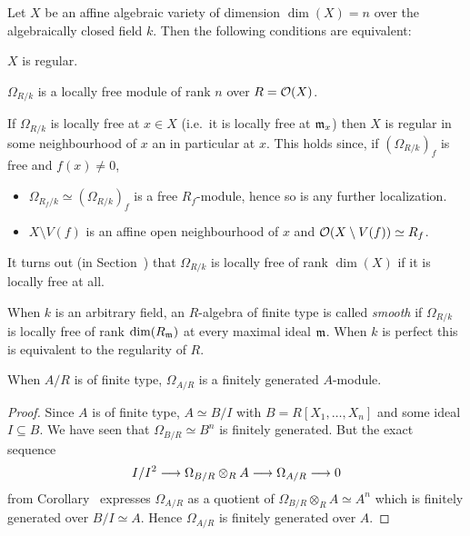 \documentclass[a4paper,parskip=half,numbers=enddot, DIV=12, headheight=30pt]{scrreprt}
\begin{document}
\begin{prop}
    Let $X$ be an affine algebraic variety of dimension $\dim (X)=n$ over the algebraically closed field $k$. Then the following conditions are equivalent:
    \begin{alphanumerate}
        \item 
            $X$ is regular.
        \item 
            $\Omega_{R/k}$ is a locally free module of rank $n$ over $R= \mathcal{O}(X)$.
    \end{alphanumerate}
\end{prop}
\begin{rem*}
    \begin{alphanumerate}
      \item 
        If $\Omega_{R/k}$ is locally free at $x\in X$ (i.e.\ it is locally free at $\mathfrak{m}_x$) then $X$ is regular in some neighbourhood of $x$ an in particular at $x$. This holds since, if $(\Omega_{R/k})_f$ is free and $f(x)\neq 0$,
        \begin{itemize}
          \item    
            $\Omega_{R_f/k}\simeq(\Omega_{R/k})_f $ is a free $R_f$-module, hence so is any further localization.
          \item 
            $X\setminus V(f)$ is an affine open neighbourhood of $x$ and $\mathcal{O}(X\setminus V(f))\simeq R_f$.
        \end{itemize}
      \item 
        It turns out (in Section~) that $\Omega_{R/k}$ is locally free of rank $\dim(X)$ if it is locally free at all. 
      \item 
        When $k$ is an arbitrary field, an $R$-algebra of finite type is called \emph{smooth} if $\Omega_{R/k}$ is locally free of rank $\dim(R_{\mathfrak{m}})$ at every maximal ideal $\mathfrak{m}$. When $k$ is perfect this is equivalent to the regularity of $R$.
    \end{alphanumerate}
\end{rem*}
\begin{lem}
    When $A/R$ is of finite type, $\Omega_{A/R}$ is a finitely generated $A$-module.
\end{lem}
\begin{proof}
    Since $A$ is of finite type, $A\simeq B/I$ with $B=R[X_1,\ldots,X_n]$ and some ideal $I\subseteq B$. We have seen that $\Omega_{B/R} \simeq B^n$ is finitely generated. But the exact sequence
    \begin{align*}
        I/I^2 \morphism \Omega_{B/R}\otimes_R A \morphism \Omega_{A/R} \morphism 0
    \end{align*}
    from Corollary~ expresses $\Omega_{A/R}$ as a quotient of $\Omega_{B/R}\otimes_R A\simeq A^n$ which is finitely generated over $B/I\simeq A$. Hence $\Omega_{A/R}$ is finitely generated over $A$.
\end{proof}
\end{document}
